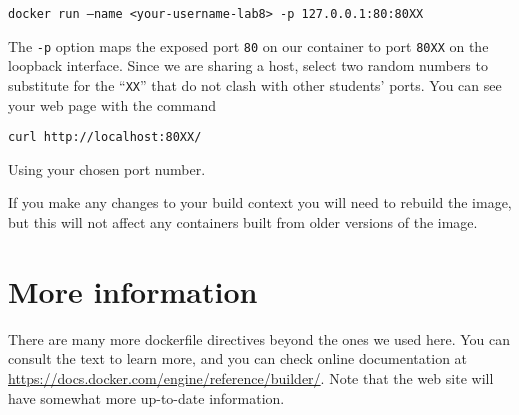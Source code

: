 \documentclass{article}
\begin{document}
\texttt{docker run --name <your-username-lab8> -p 127.0.0.1:80:80XX}

The \texttt{-p} option maps the exposed port \texttt{80} on our container to port \texttt{80XX} on the loopback interface. Since we are sharing a host, select two random numbers to substitute for the ``\texttt{XX}'' that do not clash with other students' ports. You can see your web page with the command

\texttt{curl http://localhost:80XX/}

Using your chosen port number.

If you make any changes  to your build context you will need to rebuild the image, but this will not affect any containers built from older versions of the image.


\section{More information}
There are many more dockerfile directives beyond the ones we used here. You can consult the text to learn more, and you can check online documentation at \url{https://docs.docker.com/engine/reference/builder/}. Note that the web site will have somewhat more up-to-date information.
\end{document}
